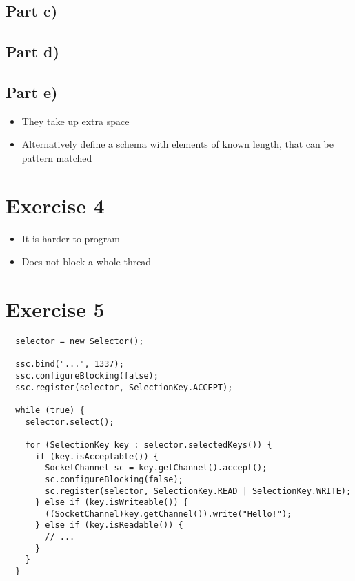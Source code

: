 \documentclass[10pt,a4paper]{article}
\begin{document}
\subsection*{Part c)}

\subsection*{Part d)}

\subsection*{Part e)}

\begin{itemize}
\item They take up extra space
\item Alternatively define a schema with elements of known length, that can be pattern matched
\end{itemize}

\section*{Exercise 4}

\begin{itemize}
\item It is harder to program
\item Does not block a whole thread
\end{itemize}

\section*{Exercise 5}

\begin{verbatim}
  selector = new Selector();

  ssc.bind("...", 1337);
  ssc.configureBlocking(false);
  ssc.register(selector, SelectionKey.ACCEPT);

  while (true) {
    selector.select();

    for (SelectionKey key : selector.selectedKeys()) {
      if (key.isAcceptable()) {
        SocketChannel sc = key.getChannel().accept();
        sc.configureBlocking(false);
        sc.register(selector, SelectionKey.READ | SelectionKey.WRITE);
      } else if (key.isWriteable()) {
        ((SocketChannel)key.getChannel()).write("Hello!");
      } else if (key.isReadable()) {
        // ...
      }
    }
  }
\end{verbatim}
\end{document}
